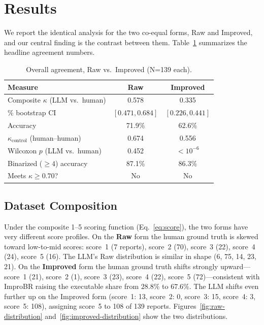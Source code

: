 \section{Results}
\label{sec:results}

We report the identical analysis for the two co-equal forms, Raw and Improved,
and our central finding is the contrast between them. Table~\ref{tab:overall}
summarizes the headline agreement numbers.

\begin{table}[!t]
\centering
\caption{Overall agreement, Raw vs.\ Improved (N=139 each).}
\label{tab:overall}
\begin{tabular}{lcc}
\toprule
Measure & Raw & Improved \\
\midrule
Composite $\kappa$ (LLM vs.\ human) & 0.578 & 0.335 \\
\quad 95\% bootstrap CI & $[0.471,0.684]$ & $[0.226,0.441]$ \\
Accuracy & 71.9\% & 62.6\% \\
$\kappa_{\text{control}}$ (human--human) & 0.674 & 0.556 \\
Wilcoxon $p$ (LLM vs.\ human) & 0.452 & $<10^{-6}$ \\
Binarized ($\geq 4$) accuracy & 87.1\% & 86.3\% \\
Meets $\kappa \geq 0.70$? & No & No \\
\bottomrule
\end{tabular}
\end{table}

\subsection{Dataset Composition}
\label{subsec:res-data}

Under the composite 1--5 scoring function (Eq.~\ref{eq:score}), the two forms
have very different score profiles. On the \textbf{Raw} form the human ground
truth is skewed toward low-to-mid scores: score~1 (7 reports), score~2 (70),
score~3 (22), score~4 (24), score~5 (16). The LLM's Raw distribution is similar
in shape (6, 75, 14, 23, 21). On the \textbf{Improved} form the human ground
truth shifts strongly upward---score~1 (21), score~2 (1), score~3 (23), score~4
(22), score~5 (72)---consistent with ImproBR raising the executable share from
$28.8\%$ to $67.6\%$. The LLM shifts even further up on the Improved form
(score~1: 13, score~2: 0, score~3: 15, score~4: 3, score~5: 108), assigning
score~5 to 108 of 139 reports. Figures~\ref{fig:raw-distribution}
and~\ref{fig:improved-distribution} show the two distributions.

